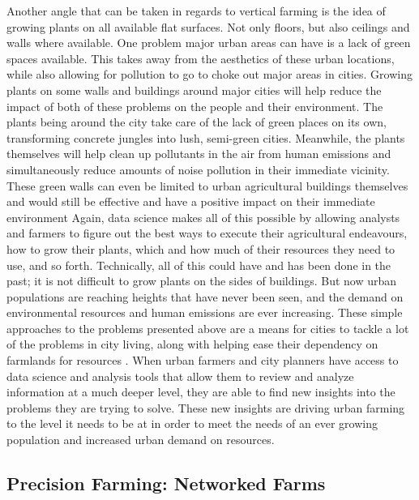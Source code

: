 \documentclass[sigconf]{acmart}
\begin{document}
Another angle that can be taken in regards to vertical farming is the idea of growing plants on all available flat surfaces. Not only floors, but also ceilings and walls where available. One problem major urban areas can have is a lack of green spaces available. This takes away from the aesthetics of these urban locations, while also allowing for pollution to go to choke out major areas in cities. Growing plants on some walls and buildings around major cities will help reduce the impact of both of these problems on the people and their environment. The plants being around the city take care of the lack of green places on its own, transforming concrete jungles into lush, semi-green cities. Meanwhile, the plants themselves will help clean up pollutants in the air from human emissions and simultaneously reduce amounts of noise pollution in their immediate vicinity. These green walls can even be limited to urban agricultural buildings themselves and would still be effective and have a positive impact on their immediate environment \cite{suparwoko2017} Again, data science makes all of this possible by allowing analysts and farmers to figure out the best ways to execute their agricultural endeavours, how to grow their plants, which and how much of their resources they need to use, and so forth. Technically, all of this could have and has been done in the past; it is not difficult to grow plants on the sides of buildings. But now urban populations are reaching heights that have never been seen, and the demand on environmental resources and human emissions are ever increasing. These simple approaches to the problems presented above are a means for cities to tackle a lot of the problems in city living, along with helping ease their dependency on farmlands for resources \cite{suparwoko2017}. When urban farmers and city planners have access to data science and analysis tools that allow them to review and analyze information at a much deeper level, they are able to find new insights into the problems they are trying to solve. These new insights are driving urban farming to the level it needs to be at in order to meet the needs of an ever growing population and increased urban demand on resources.

\subsection{Precision Farming: Networked Farms}
\end{document}
